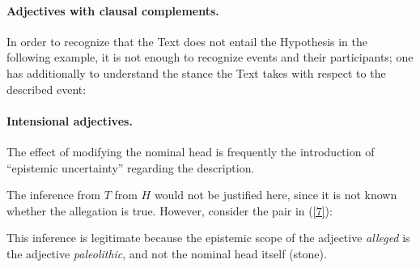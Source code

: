 \documentclass[10pt]{article}
\begin{document}
 \vspace{-.15in}
\paragraph{Adjectives with clausal complements.}  In order to recognize that the Text does not entail the Hypothesis in the following example, it is not enough to recognize events and their participants;  one has additionally to understand the stance the Text takes with respect to the described event:

 \vspace{-.1in}

  \vspace{-.25in}
\paragraph{Intensional adjectives.} The effect of modifying the nominal head is frequently the introduction of ``epistemic uncertainty'' regarding the description. 

 \vspace{-.1in}
 \vspace{-.1in}
The inference from $T$ from $H$ would not be justified here, since it is not known whether the allegation is true. However, consider the pair in (\ref{7}):
 \vspace{-.1in}


 \vspace{-.1in}
\noindent This inference is legitimate because the epistemic scope of the adjective {\it alleged} is the adjective {\it paleolithic}, and not the nominal head  itself (stone). 
\end{document}
